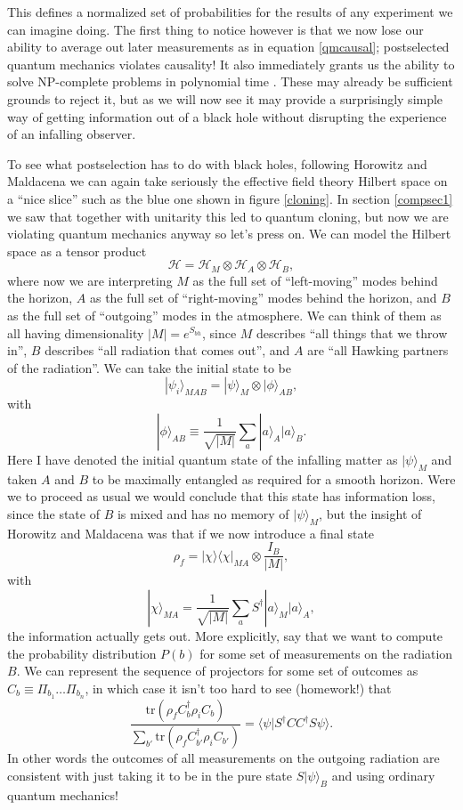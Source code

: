 \documentclass[12pt]{article}
\newcommand{\be}{\begin{equation}}
\newcommand{\ee}{\end{equation}}
\newcommand{\HA}{\mathcal{H}_A}
\newcommand{\HB}{\mathcal{H}_B}
\newcommand{\lan}{\langle}
\newcommand{\ran}{\rangle}
\newcommand{\tr}{\mathrm{tr}}
\begin{document}
This defines a normalized set of probabilities for the results of any experiment we can imagine doing.  The first thing to notice however is that we now lose our ability to average out later measurements as in equation \eqref{qmcausal}; postselected quantum mechanics violates causality!  It also immediately grants us the ability to solve NP-complete problems in polynomial time \cite{Aaronson:2005qu}.  These may already be sufficient grounds to reject it, but as we will now see it may provide a surprisingly simple way of getting information out of a black hole without disrupting the experience of an infalling observer.  

To see what postselection has to do with black holes, following Horowitz and Maldacena we can again take seriously the effective field theory Hilbert space on a ``nice slice'' such as the blue one shown in figure \ref{cloning}.  In section \ref{compsec1} we saw that together with unitarity this led to quantum cloning, but now we are violating quantum mechanics anyway so let's press on.  We can model the Hilbert space as a tensor product
\be
\mathcal{H}=\mathcal{H}_M \otimes \HA \otimes \HB,
\ee
where now we are interpreting $M$ as the full set of ``left-moving'' modes behind the horizon, $A$ as the full set of ``right-moving'' modes behind the horizon, and $B$ as the full set of ``outgoing'' modes in the atmosphere.  We can think of them as all having dimensionality $|M|=e^{S_{\mathit{bh}}}$, since $M$ describes ``all things that we throw in'', $B$ describes ``all radiation that comes out'', and $A$ are ``all Hawking partners of the radiation''.  We can take the initial state to be
\be\label{initial}
|\psi_i\ran_{MAB}=|\psi\ran_M \otimes |\phi\ran_{AB}, 
\ee
with 
\be
|\phi\ran_{AB}\equiv \frac{1}{\sqrt{|M|}}\sum_a |a\ran_A |a\ran_B.
\ee
Here I have denoted the initial quantum state of the infalling matter as $|\psi\ran_M$ and taken $A$ and $B$ to be maximally entangled as required for a smooth horizon.  Were we to proceed as usual we would conclude that this state has information loss, since the state of $B$ is mixed and has no memory of $|\psi\ran_M$, but the insight of Horowitz and Maldacena was that if we now introduce a final state
\be
\rho_f=|\chi\ran \lan\chi|_{MA} \otimes \frac{I_B}{|M|},
\ee
with 
\be
|\chi\ran_{MA}=\frac{1}{\sqrt{|M|}}\sum_a S^\dagger|a\ran_M |a\ran_A,
\ee
the information actually gets out.  More explicitly, say that we want to compute the probability distribution $P(b)$ for some set of measurements on the radiation $B$.  We can represent the sequence of projectors for some set of outcomes as $C_b\equiv \Pi_{b_1}\ldots \Pi_{b_n}$, in which case it isn't too hard to see (homework!) that
\be\label{finalstateresult}
\frac{\tr\left(\rho_f C_b^\dagger \rho_i C_b\right)}{\sum_{b'}\tr \left(\rho_f C_{b'}^\dagger\rho_i C_{b'}\right)}=\lan \psi|S^\dagger C C^\dagger S \psi\ran.
\ee
In other words the outcomes of all measurements on the outgoing radiation are consistent with just taking it to be in the pure state $S|\psi\ran_B$ and using ordinary quantum mechanics!  
\end{document}
